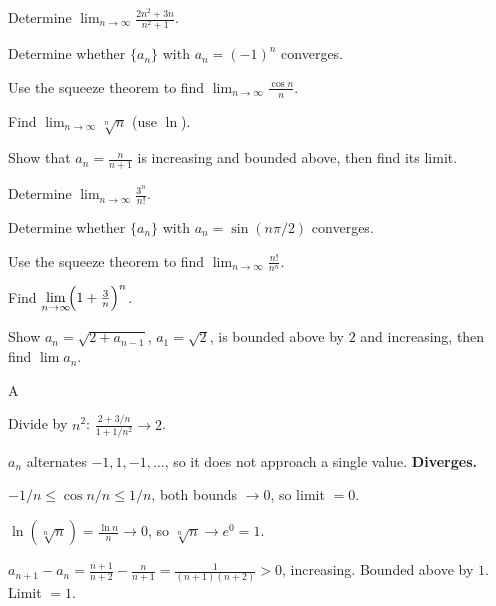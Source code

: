 \documentclass[11pt]{article}
\begin{document}
\begin{problems}
\item Determine $\displaystyle \lim_{n \to \infty} \frac{2n^2 + 3n}{n^2 + 1}$.
\item Determine whether $\{a_n\}$ with $a_n = (-1)^n$ converges.
\item Use the squeeze theorem to find $\displaystyle \lim_{n \to \infty} \frac{\cos n}{n}$.
\item Find $\displaystyle \lim_{n \to \infty} \sqrt[n]{n}$ (use $\ln$).
\item Show that $a_n = \tfrac{n}{n+1}$ is increasing and bounded above, then find its limit.
\end{problems}

\vfill
\newpage
{}
\begin{problems}
\item Determine $\displaystyle \lim_{n \to \infty} \frac{3^n}{n!}$.
\item Determine whether $\{a_n\}$ with $a_n = \sin(n\pi/2)$ converges.
\item Use the squeeze theorem to find $\displaystyle \lim_{n \to \infty} \frac{n!}{n^n}$.
\item Find $\displaystyle \lim_{n \to \infty} \!\Bigl(1 + \tfrac{3}{n}\Bigr)^n$.
\item Show $a_n = \sqrt{2 + a_{n-1}}$, $a_1 = \sqrt 2$, is bounded above by $2$ and increasing, then find $\lim a_n$.
\end{problems}

\vfill
\newpage
{}

\begin{answers}{A}
\item Divide by $n^2$: $\tfrac{2 + 3/n}{1 + 1/n^2} \to \boxed{2}$.
\item $a_n$ alternates $-1, 1, -1, \ldots$, so it does not approach a single value. \textbf{Diverges.}
\item $-1/n \le \cos n / n \le 1/n$, both bounds $\to 0$, so limit $= \boxed{0}$.
\item $\ln(\sqrt[n]{n}) = \tfrac{\ln n}{n} \to 0$, so $\sqrt[n]{n} \to e^0 = \boxed{1}$.
\item $a_{n+1} - a_n = \tfrac{n+1}{n+2} - \tfrac{n}{n+1} = \tfrac{1}{(n+1)(n+2)} > 0$, increasing. Bounded above by $1$. Limit $= \boxed{1}$.
\end{answers}
\end{document}
